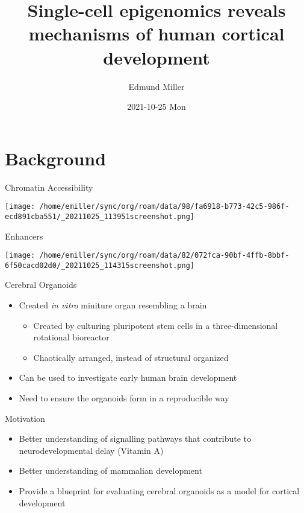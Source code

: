 \documentclass[bigger]{beamer}
\author{Edmund Miller}
\date{2021-10-25 Mon}
\title{Single-cell epigenomics reveals mechanisms of human cortical development}
\begin{document}
\maketitle

\section{Background}
\label{sec:orgeb6b205}
\begin{frame}[label={sec:org160b449}]{Chromatin Accessibility}
\begin{center}
\texttt{[image: /home/emiller/sync/org/roam/data/98/fa6918-b773-42c5-986f-ecd891cba551/\_20211025\_113951screenshot.png]}
\end{center}
\end{frame}
\begin{frame}[label={sec:orgeb31a7d}]{Enhancers}
\begin{center}
\texttt{[image: /home/emiller/sync/org/roam/data/82/072fca-90bf-4ffb-8bbf-6f50cacd02d0/\_20211025\_114315screenshot.png]}
\end{center}
\end{frame}


\begin{frame}[label={sec:orgc34be7d}]{Cerebral Organoids}
\begin{itemize}
\item Created \emph{in vitro} miniture organ resembling a brain
\begin{itemize}
\item Created by culturing pluripotent stem cells in a three-dimensional
rotational bioreactor
\item Chaotically arranged, instead of structural organized
\end{itemize}
\item Can be used to investigate early human brain development
\item Need to ensure the organoids form in a reproducible way
\end{itemize}
\end{frame}

\begin{frame}[label={sec:org53d587b}]{Motivation}
\begin{itemize}
\item Better understanding of signalling pathways that contribute to
neurodevelopmental delay (Vitamin A)
\item Better understanding of mammalian development
\item Provide a blueprint for evaluating cerebral organoids as a model for cortical
development
\end{itemize}
\end{frame}
\end{document}
